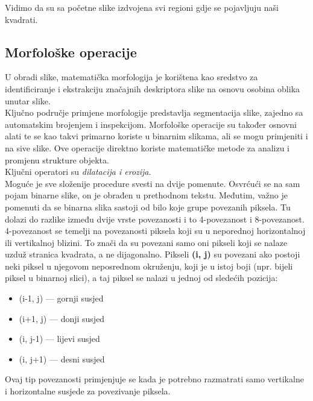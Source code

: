\documentclass[a4paper,12pt]{article}
\begin{document}
Vidimo da su sa početne slike izdvojena svi regioni gdje se pojavljuju naši kvadrati.

\subsection{Morfološke operacije}


U obradi slike, matematička morfologija je korištena kao sredstvo za identificiranje i ekstrakciju značajnih deskriptora slike na osnovu osobina oblika unutar slike. \\

Ključno područje primjene morfologije predstavlja segmentacija slike, zajedno sa automatskim brojenjem i inspekcijom. 
Morfološke operacije su također osnovni alati te se kao takvi primarno koriste u binarnim slikama, ali se mogu primjeniti i na sive slike.
 Ove operacije direktno koriste matematičke metode za analizu i promjenu strukture objekta. \\

Ključni operatori su \textit{dilatacija i erozija}. \\

Moguće je sve složenije procedure svesti na dvije pomenute. 
Osvrćući se na sam pojam binarne slike, on je obrađen u prethodnom tekstu. 
Međutim, važno je pomenuti da se binarna slika sastoji od bilo koje grupe povezanih piksela. Tu dolazi do razlike između dvije vrste povezanosti i to 4-povezanost i 8-povezanost. 4-povezanost se temelji na povezanosti piksela koji su u neporednoj horizontalnoj ili vertikalnoj blizini. 
To znači da su povezani samo oni pikseli koji se nalaze uzduž stranica kvadrata, a ne dijagonalno. Pikseli \textbf{(i, j)} su povezani ako postoji neki piksel u njegovom neposrednom okruženju, koji je u istoj boji (npr. bijeli piksel u binarnoj slici), a taj piksel se nalazi u jednoj od sledećih pozicija:
\begin{itemize}
\item (i-1, j) — gornji susjed
\item (i+1, j) — donji susjed
\item (i, j-1) — lijevi susjed
\item (i, j+1) — desni susjed

\end{itemize}
Ovaj tip povezanosti primjenjuje se kada je potrebno razmatrati samo vertikalne i horizontalne susjede za povezivanje piksela. \\
\end{document}
